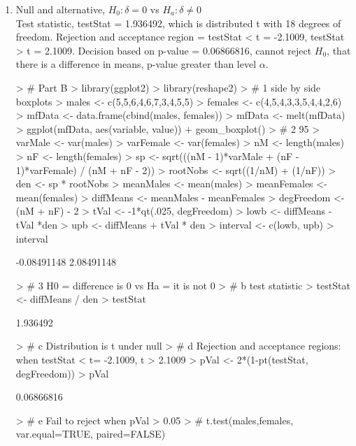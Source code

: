 \documentclass{article}
\begin{document}
\begin{enumerate}
\item Null and alternative, $ H_0: \delta = 0 $ vs $ H_a: \delta \neq 0 $ \\
Test statistic, testStat = 1.936492, which is distributed t with 18 degrees of freedom. Rejection and acceptance region = testStat < t = -2.1009, testStat > t = 2.1009. Decision based on p-value = 0.06866816, cannot reject $H_0$, that there is a difference in means, p-value greater than level $\alpha$. 
\begin{Schunk}
\begin{Sinput}
> # Part B
> library(ggplot2)
> library(reshape2)
>   # 1 side by side boxplots
> males <- c(5,5,6,4,6,7,3,4,5,5)
> females <- c(4,5,4,3,3,5,4,4,2,6)
> mfData <- data.frame(cbind(males, females))
> mfData <- melt(mfData)
> ggplot(mfData, aes(variable, value)) + geom_boxplot()
>   # 2 95% CI
> varMale <- var(males)
> varFemale <- var(females)
> nM <- length(males)
> nF <- length(females)
> sp <- sqrt(((nM - 1)*varMale + (nF - 1)*varFemale) / (nM + nF - 2))
> rootNobs <- sqrt((1/nM) + (1/nF))
> den <- sp * rootNobs
> meanMales <- mean(males)
> meanFemales <- mean(females)
> diffMeans <- meanMales - meanFemales
> degFreedom <- (nM + nF) - 2
> tVal <- -1*qt(.025, degFreedom)
> lowb <- diffMeans - tVal *den
> upb <- diffMeans + tVal * den
> interval <- c(lowb, upb)
> interval
\end{Sinput}
\begin{Soutput}
[1] -0.08491148  2.08491148
\end{Soutput}
\begin{Sinput}
>   # 3 H0 = difference is 0 vs Ha = it is not 0
>   # b test statistic
> testStat <- diffMeans / den
> testStat
\end{Sinput}
\begin{Soutput}
[1] 1.936492
\end{Soutput}
\begin{Sinput}
>   # c Distribution is t under null
>   # d Rejection and acceptance regions: when testStat < t= -2.1009, t > 2.1009
> pVal <- 2*(1-pt(testStat, degFreedom))
> pVal
\end{Sinput}
\begin{Soutput}
[1] 0.06866816
\end{Soutput}
\begin{Sinput}
>   # e Fail to reject when pVal > 0.05
> # t.test(males,females, var.equal=TRUE, paired=FALSE)
\end{Sinput}
\end{Schunk}


\end{enumerate}
\end{document}
